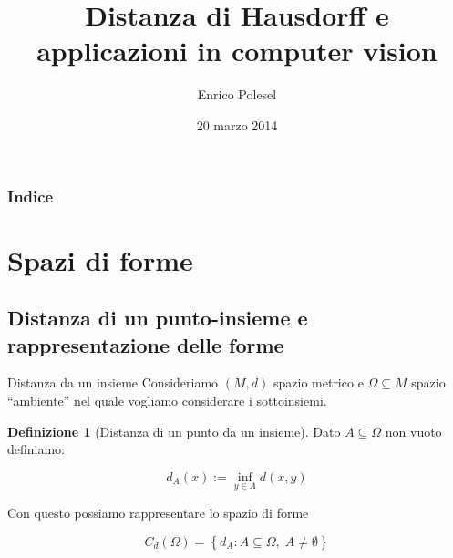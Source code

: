 \documentclass{beamer}
\title[Distanza di Hausdorff e applicazioni in computer
vision]{Distanza di Hausdorff e applicazioni in computer vision}
\author{Enrico Polesel}
\institute[Scuola Normale Superiore]{Scuola Normale Superiore}
\date{20 marzo 2014}
\newcounter{counter1}
\theoremstyle{plain}
\theoremstyle{definition}
\newtheorem{mydef}[counter1]{Definizione}
\theoremstyle{remark}
\newcommand{\set}[1]{\left\{#1\right\}}
\begin{document}
\begin{frame}[plain]
  \titlepage
\end{frame}

\begin{frame}[plain]
 \frametitle{Indice}
 \tableofcontents
\end{frame}




\AtBeginSubsection[]
{
  \begin{frame}[plain]{\secname $\rightarrow$ \subsecname}
    \tableofcontents[currentsubsection]
  \end{frame}
}

\section{Spazi di forme}

\subsection{Distanza di un punto-insieme e rappresentazione delle forme}


\begin{frame}{Distanza da un insieme}
  Consideriamo $(M,d)$ spazio metrico e $\Omega \subseteq M$ spazio
  ``ambiente'' nel quale vogliamo considerare i sottoinsiemi.
  
  \begin{mydef}[Distanza di un punto da un insieme]
    Dato $A \subseteq \Omega$ non vuoto definiamo:
    
    \[  d_A (x) := \inf _{y \in A} d(x,y) \] 
  \end{mydef}
  
  Con questo possiamo rappresentare lo spazio di forme
  
  \[ C_d(\Omega) = \set{d_A : A \subseteq \Omega,\; A \neq \emptyset} \]
\end{frame}
\end{document}
